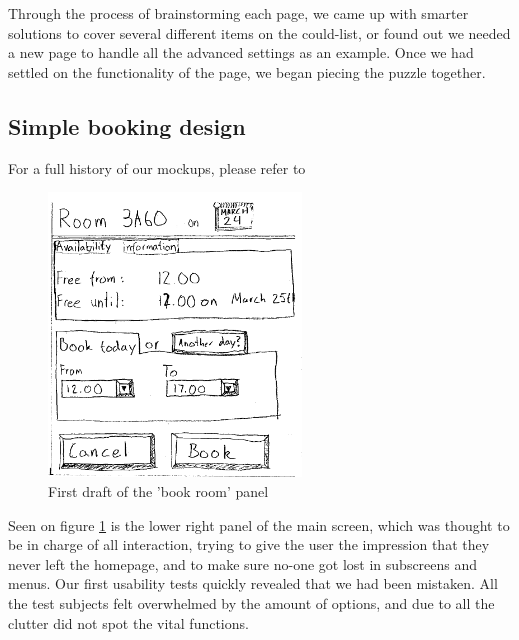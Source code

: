 Through the process of brainstorming each page, we came up with smarter solutions to cover several different items on the could-list, or found out we needed a new page to handle all the advanced settings as an example. Once we had settled on the functionality of the page, we began piecing the puzzle together.



\subsection{Simple booking design}
For a full history of our mockups, please refer to %

\begin{figure}[htb]
\begin{center}
\leavevmode
\includegraphics[width=0.6\textwidth]{images/bookRoomMockup}
\end{center}
\caption{First draft of the 'book room' panel}
\label{fig:book_room_mockup}
\end{figure}

Seen on figure \ref{fig:book_room_mockup} is the lower right panel of the main screen, which was thought to be in charge of all interaction, trying to give the user the impression that they never left the homepage, and to make sure no-one got lost in subscreens and menus. Our first usability tests quickly revealed that we had been mistaken. All the test subjects felt overwhelmed by the amount of options, and due to all the clutter did not spot the vital functions.

